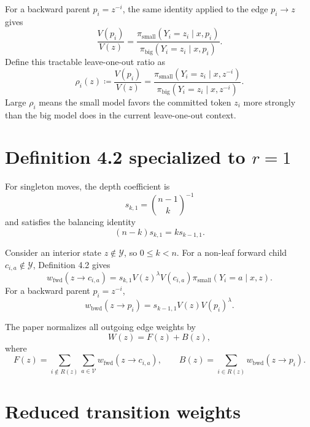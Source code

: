 \documentclass[11pt]{article}
\newcommand{\pb}{\pi_{\mathrm{big}}}
\newcommand{\ps}{\pi_{\mathrm{small}}}
\newcommand{\Vocab}{\mathcal{V}}
\newcommand{\Y}{\mathcal{Y}}
\newcommand{\R}{R}
\begin{document}
For a backward parent $p_i=z^{-i}$, the same identity applied to the edge $p_i\to z$ gives
\begin{equation}
\frac{V(p_i)}{V(z)}
=
\frac{\ps(Y_i=z_i\mid x,p_i)}{\pb(Y_i=z_i\mid x,p_i)}.
\end{equation}
Define this tractable leave-one-out ratio as
\begin{equation}
\boxed{
\rho_i(z)
\coloneqq
\frac{V(p_i)}{V(z)}
=
\frac{\ps(Y_i=z_i\mid x,z^{-i})}
     {\pb(Y_i=z_i\mid x,z^{-i})}
}.
\label{eq:rho}
\end{equation}
Large $\rho_i$ means the small model favors the committed token $z_i$ more strongly than the big model does in the current leave-one-out context.

\section{Definition 4.2 specialized to $r=1$}

For singleton moves, the depth coefficient is
\begin{equation}
\boxed{
 s_{k,1} = \binom{n-1}{k}^{-1}
}
\end{equation}
and satisfies the balancing identity
\begin{equation}
(n-k)s_{k,1}=k s_{k-1,1}.
\end{equation}

Consider an interior state $z\notin\Y$, so $0\le k<n$. For a non-leaf forward child $c_{i,a}\notin\Y$, Definition 4.2 gives
\begin{equation}
w_{\mathrm{fwd}}(z\to c_{i,a})
=
s_{k,1}
V(z)^\lambda
V(c_{i,a})
\ps(Y_i=a\mid x,z).
\label{eq:def42-forward}
\end{equation}
For a backward parent $p_i=z^{-i}$,
\begin{equation}
w_{\mathrm{bwd}}(z\to p_i)
=
s_{k-1,1}
V(z)
V(p_i)^\lambda.
\label{eq:def42-backward}
\end{equation}

The paper normalizes all outgoing edge weights by
\begin{equation}
W(z)=F(z)+B(z),
\end{equation}
where
\begin{equation}
F(z)=\sum_{i\notin\R(z)}\sum_{a\in\Vocab}
w_{\mathrm{fwd}}(z\to c_{i,a}),
\qquad
B(z)=\sum_{i\in\R(z)}w_{\mathrm{bwd}}(z\to p_i).
\end{equation}

\section{Reduced transition weights}
\end{document}
